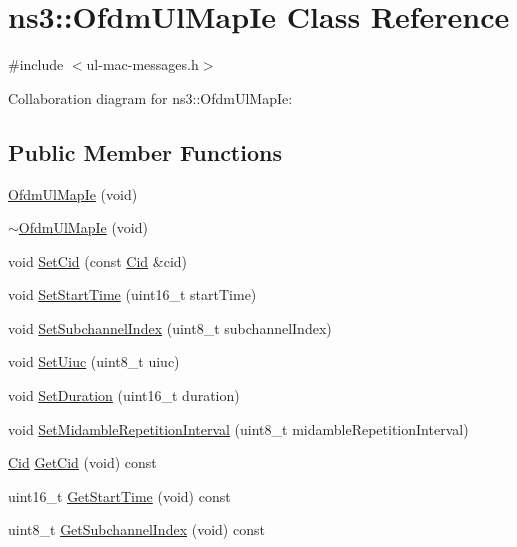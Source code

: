 \hypertarget{classns3_1_1OfdmUlMapIe}{}\section{ns3\+:\+:Ofdm\+Ul\+Map\+Ie Class Reference}
\label{classns3_1_1OfdmUlMapIe}


{\ttfamily \#include $<$ul-\/mac-\/messages.\+h$>$}



Collaboration diagram for ns3\+:\+:Ofdm\+Ul\+Map\+Ie\+:
\subsection*{Public Member Functions}
\begin{DoxyCompactItemize}
\item 
\hyperlink{classns3_1_1OfdmUlMapIe_a015f53a22605c79cb8645ebd1b5a1950}{Ofdm\+Ul\+Map\+Ie} (void)
\item 
\hyperlink{classns3_1_1OfdmUlMapIe_ae84ff76bcc4956d16130457364d6d401}{$\sim$\+Ofdm\+Ul\+Map\+Ie} (void)
\item 
void \hyperlink{classns3_1_1OfdmUlMapIe_acefa1143865838f7f68460d968541602}{Set\+Cid} (const \hyperlink{classns3_1_1Cid}{Cid} \&cid)
\item 
void \hyperlink{classns3_1_1OfdmUlMapIe_a454d00f90ba63b6dc6aa30ff4bcde299}{Set\+Start\+Time} (uint16\+\_\+t start\+Time)
\item 
void \hyperlink{classns3_1_1OfdmUlMapIe_a81cafd6d8de002047b3de1550c3ecf6f}{Set\+Subchannel\+Index} (uint8\+\_\+t subchannel\+Index)
\item 
void \hyperlink{classns3_1_1OfdmUlMapIe_ae47ccb62db7e563b22930b85c93e8425}{Set\+Uiuc} (uint8\+\_\+t uiuc)
\item 
void \hyperlink{classns3_1_1OfdmUlMapIe_a5e6e84ad58409d851bdcbd7fe1d8d23c}{Set\+Duration} (uint16\+\_\+t duration)
\item 
void \hyperlink{classns3_1_1OfdmUlMapIe_a74622b6061786c32e267bec4ba3834a5}{Set\+Midamble\+Repetition\+Interval} (uint8\+\_\+t midamble\+Repetition\+Interval)
\item 
\hyperlink{classns3_1_1Cid}{Cid} \hyperlink{classns3_1_1OfdmUlMapIe_a0b4154f7de67cf11d829136eb73321ae}{Get\+Cid} (void) const 
\item 
uint16\+\_\+t \hyperlink{classns3_1_1OfdmUlMapIe_a5ac7fd62742545755768b6fb8db9490c}{Get\+Start\+Time} (void) const 
\item 
uint8\+\_\+t \hyperlink{classns3_1_1OfdmUlMapIe_a49eb51c5fc12bf51a0a36f32527dfa3a}{Get\+Subchannel\+Index} (void) const 

\end{DoxyCompactItemize}
